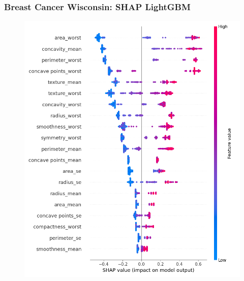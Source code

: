 \documentclass{beamer}
\begin{document}
\begin{frame}
\frametitle{Breast Cancer Wisconsin: SHAP LightGBM}
\begin{figure}[H]
 \centering
 \includegraphics[scale=0.3]{shap_cancer.png}
\end{figure}
\end{frame}











\end{document}
